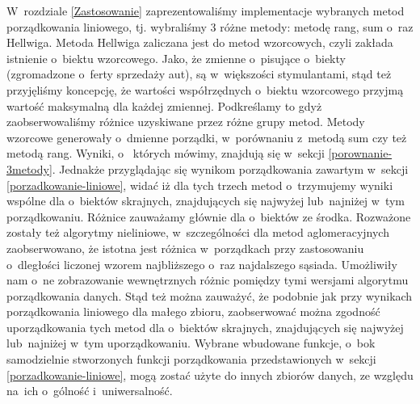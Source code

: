 \documentclass[12pt,a4paper]{report}
\begin{document}
W~rozdziale \ref{Zastosowanie} zaprezentowaliśmy implementacje wybranych metod porządkowania liniowego, tj. wybraliśmy 3 różne metody: metodę rang, sum o~raz Hellwiga. Metoda Hellwiga zaliczana jest do metod wzorcowych, czyli zakłada istnienie o~biektu wzorcowego. Jako, że zmienne o~pisujące o~biekty (zgromadzone o~ferty sprzedaży aut), są w~większości stymulantami, stąd też przyjęliśmy koncepcję, że wartości współrzędnych o~biektu wzorcowego przyjmą wartość maksymalną dla każdej zmiennej. Podkreślamy to gdyż zaobserwowaliśmy różnice uzyskiwane przez różne grupy metod. Metody wzorcowe generowały o~dmienne porządki, w~porównaniu z~metodą sum czy też metodą rang. Wyniki, o~ których mówimy, znajdują się w~sekcji \ref{porownanie-3metody}. Jednakże przyglądając się wynikom porządkowania zawartym  w~sekcji \ref{porzadkowanie-liniowe}, widać iż dla tych trzech metod o~trzymujemy wyniki wspólne dla o~biektów skrajnych, znajdujących się najwyżej lub~najniżej w~tym porządkowaniu. Różnice zauważamy głównie dla o~biektów ze środka. %
Rozważone zostały też algorytmy nieliniowe, w~szczególności dla metod aglomeracyjnych zaobserwowano, że 
istotna jest różnica w~porządkach przy zastosowaniu o~dległości liczonej wzorem najbliższego o~raz najdalszego sąsiada. Umożliwiły nam o~ne zobrazowanie wewnętrznych różnic pomiędzy tymi wersjami algorytmu porządkowania danych. Stąd też można zauważyć, że podobnie jak przy wynikach porządkowania liniowego dla małego zbioru, zaobserwować można zgodność uporządkowania tych metod dla o~biektów skrajnych, znajdujących się najwyżej lub~najniżej w~tym uporządkowaniu.
Wybrane wbudowane funkcje, o~bok samodzielnie stworzonych funkcji porządkowania przedstawionych w~sekcji \ref{porzadkowanie-liniowe}, mogą zostać użyte do innych zbiorów danych, ze względu na~ich o~gólność i~uniwersalność. 
 


\end{document}
